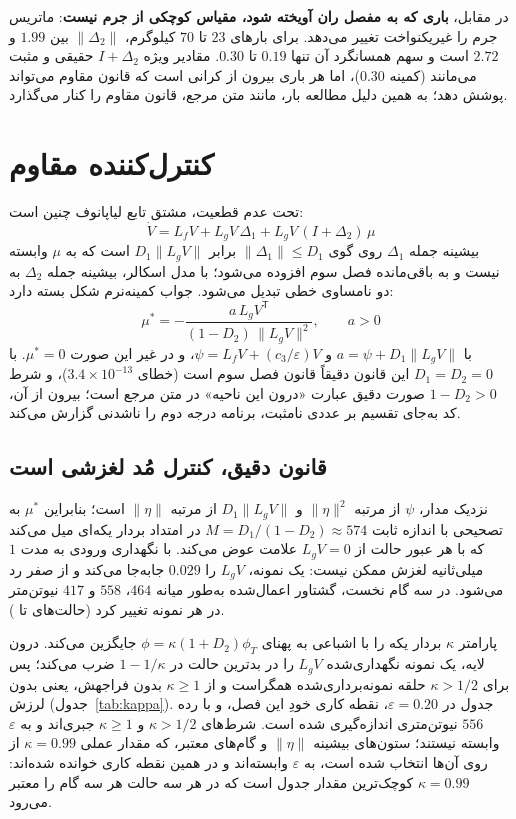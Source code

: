 \documentclass[10pt,twocolumn]{article}
\newcommand{\en}[1]{\lr{#1}}
\begin{document}
در مقابل، \textbf{باری که به مفصل ران آویخته شود، مقیاس کوچکی از جرم نیست}:
ماتریس جرم را غیریکنواخت تغییر می‌دهد. برای بارهای $23$ تا $70$ کیلوگرم،
$\|\Delta_2\|$ بین $1.99$ و $2.72$ است و سهم همسانگرد آن تنها $0.19$ تا $0.30$.
مقادیر ویژه $I+\Delta_2$ حقیقی و مثبت می‌مانند (کمینه $0.30$)، اما هر باری بیرون
از کرانی است که قانون مقاوم می‌تواند پوشش دهد؛ به همین دلیل مطالعه بار، مانند
متن مرجع، قانون مقاوم را کنار می‌گذارد.

\section{کنترل‌کننده \en{CLF-QP} مقاوم}
تحت عدم قطعیت، مشتق تابع لیاپانوف چنین است:
\begin{equation}
    \dot V = L_fV + L_gV\,\Delta_1 + L_gV\,(I+\Delta_2)\,\mu
\end{equation}
بیشینه جمله $\Delta_1$ روی گوی $\|\Delta_1\|\le D_1$ برابر $D_1\|L_gV\|$ است که به
$\mu$ وابسته نیست و به باقی‌مانده فصل سوم افزوده می‌شود؛ با مدل اسکالر، بیشینه
جمله $\Delta_2$ به دو نامساوی خطی تبدیل می‌شود. جواب کمینه‌نرم شکل بسته دارد:
\begin{equation}
    \mu^* = -\frac{a\,L_gV^{\mathsf T}}{(1-D_2)\,\|L_gV\|^2},\qquad a>0
    \label{eq:rclf}
\end{equation}
با $a=\psi+D_1\|L_gV\|$ و $\psi=L_fV+(c_3/\varepsilon)V$، و در غیر این صورت
$\mu^*=0$. با $D_1=D_2=0$ این قانون دقیقاً قانون فصل سوم است (خطای
$3.4\times10^{-13}$)، و شرط $1-D_2>0$ صورت دقیق عبارت «درون این ناحیه» در متن
مرجع است؛ بیرون از آن، کد به‌جای تقسیم بر عددی نامثبت، برنامه درجه دوم را ناشدنی
گزارش می‌کند.

\subsection{قانون دقیق، کنترل مُد لغزشی است}
نزدیک مدار، $\psi$ از مرتبه $\|\eta\|^2$ و $D_1\|L_gV\|$ از مرتبه $\|\eta\|$ است؛
بنابراین $\mu^*$ به تصحیحی با اندازه ثابت $M=D_1/(1-D_2)\approx574$ در امتداد
بردار یکه‌ای میل می‌کند که با هر عبور حالت از $L_gV=0$ علامت عوض می‌کند. با
نگهداری ورودی به مدت $1$ میلی‌ثانیه لغزش ممکن نیست: یک نمونه، $L_gV$ را
$0.029$ جابه‌جا می‌کند و از صفر رد می‌شود. در سه گام نخست، گشتاور اعمال‌شده به‌طور
میانه $464$، $558$ و $417$ نیوتن‌متر در هر نمونه تغییر کرد (حالت‌های \en{I} تا \en{III}).

پارامتر $\kappa$ بردار یکه را با اشباعی به پهنای
$\phi=\kappa(1+D_2)\phi_T$ جایگزین می‌کند. درون لایه، یک نمونه نگهداری‌شده $L_gV$
را در بدترین حالت در $1-1/\kappa$ ضرب می‌کند؛ پس برای $\kappa>1/2$ حلقه
نمونه‌برداری‌شده همگراست و از $\kappa\ge1$ بدون فراجهش، یعنی بدون لرزش
(جدول~\ref{tab:kappa}). جدول در $\varepsilon=0.20$، نقطه کاری خودِ این فصل، و با رده
$556$ نیوتن‌متری اندازه‌گیری شده است. شرط‌های $\kappa>1/2$ و $\kappa\ge1$ جبری‌اند و به
$\varepsilon$ وابسته نیستند؛ ستون‌های بیشینه $\|\eta\|$ و گام‌های معتبر، که مقدار عملی
$\kappa=0.99$ از روی آن‌ها انتخاب شده است، به $\varepsilon$ وابسته‌اند و در همین نقطه کاری
خوانده شده‌اند: $\kappa=0.99$ کوچک‌ترین مقدار جدول است که در هر سه حالت هر سه گام را معتبر
می‌رود.
\end{document}
